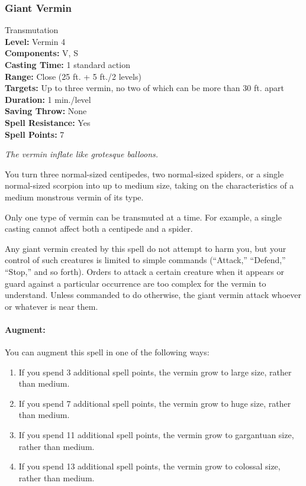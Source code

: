 \subsubsection{Giant Vermin}
\label{Spell:GiantVermin}
Transmutation
\\ \textbf{Level:} Vermin 4
\\ \textbf{Components:} V, S
\\ \textbf{Casting Time:} 1 standard action
\\ \textbf{Range:} Close (25 ft. + 5 ft./2 levels)
\\ \textbf{Targets:} Up to three vermin, no two of which can be more than 30 ft. apart
\\ \textbf{Duration:} 1 min./level
\\ \textbf{Saving Throw:} None
\\ \textbf{Spell Resistance:} Yes
\\ \textbf{Spell Points:} 7

\emph{The vermin inflate like grotesque balloons.}

You turn three normal-sized centipedes, two normal-sized spiders, or a single normal-sized scorpion into up to medium size, taking on the characteristics of a medium monstrous vermin of its type. 

Only one type of vermin can be transmuted at a time. For example, a single casting cannot affect both a centipede and a spider.

Any giant vermin created by this spell do not attempt to harm you, but your control of such creatures is limited to simple commands (``Attack,'' ``Defend,'' ``Stop,'' and so forth). 
Orders to attack a certain creature when it appears or guard against a particular occurrence are too complex for the vermin to understand. 
Unless commanded to do otherwise, the giant vermin attack whoever or whatever is near them.

\paragraph{Augment:} You can augment this spell in one of the following ways:
\begin{enumerate}
 \item If you spend 3 additional spell points, the vermin grow to large size, rather than medium.
 \item If you spend 7 additional spell points, the vermin grow to huge size, rather than medium.
 \item If you spend 11 additional spell points, the vermin grow to gargantuan size, rather than medium.
 \item If you spend 13 additional spell points, the vermin grow to colossal size, rather than medium.
\end{enumerate}

